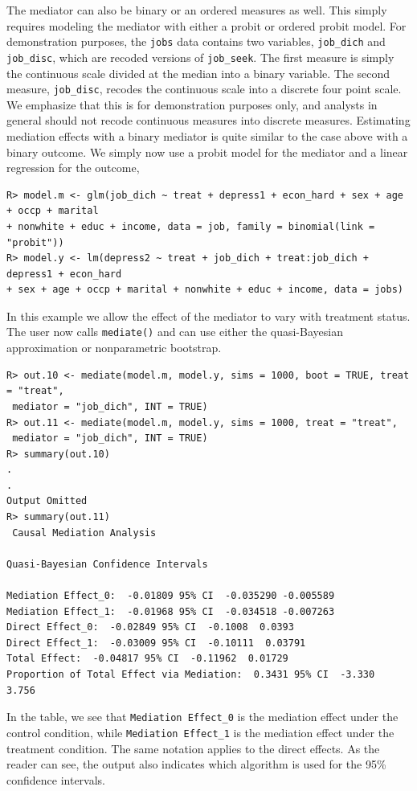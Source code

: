 \documentclass[11pt,letterpaper]{article}
\theoremstyle{plain}
\begin{document}
The mediator can also be binary or an ordered measures as well.  This
simply requires modeling the mediator with either a probit or ordered
probit model.  For demonstration purposes, the \texttt{jobs} data
contains two variables, \texttt{job\_dich} and \texttt{job\_disc},
which are recoded versions of \texttt{job\_seek}.  The first measure
is simply the continuous scale divided at the median into a binary
variable.  The second measure, \texttt{job\_disc}, recodes the
continuous scale into a discrete four point scale.  We emphasize that
this is for demonstration purposes only, and analysts in general
should not recode continuous measures into discrete measures.
Estimating mediation effects with a binary mediator is quite similar
to the case above with a binary outcome.  We simply now use a probit
model for the mediator and a linear regression for the outcome,
\begin{verbatim}
R> model.m <- glm(job_dich ~ treat + depress1 + econ_hard + sex + age + occp + marital
+ nonwhite + educ + income, data = job, family = binomial(link = "probit"))
R> model.y <- lm(depress2 ~ treat + job_dich + treat:job_dich + depress1 + econ_hard
+ sex + age + occp + marital + nonwhite + educ + income, data = jobs)
\end{verbatim}

In this example we allow the effect of the mediator to vary with
treatment status.  The user now calls \texttt{mediate()} and can use
either the quasi-Bayesian approximation or nonparametric bootstrap.
\begin{verbatim}
R> out.10 <- mediate(model.m, model.y, sims = 1000, boot = TRUE, treat = "treat", 
 mediator = "job_dich", INT = TRUE)
R> out.11 <- mediate(model.m, model.y, sims = 1000, treat = "treat", 
 mediator = "job_dich", INT = TRUE)
R> summary(out.10)
.
.
Output Omitted
R> summary(out.11)
 Causal Mediation Analysis 

Quasi-Bayesian Confidence Intervals

Mediation Effect_0:  -0.01809 95% CI  -0.035290 -0.005589 
Mediation Effect_1:  -0.01968 95% CI  -0.034518 -0.007263 
Direct Effect_0:  -0.02849 95% CI  -0.1008  0.0393 
Direct Effect_1:  -0.03009 95% CI  -0.10111  0.03791 
Total Effect:  -0.04817 95% CI  -0.11962  0.01729 
Proportion of Total Effect via Mediation:  0.3431 95% CI  -3.330  3.756 
\end{verbatim}

\noindent In the table, we see that \texttt{Mediation Effect\_0} is
the mediation effect under the control condition, while
\texttt{Mediation Effect\_1} is the mediation effect under the
treatment condition.  The same notation applies to the direct effects.
As the reader can see, the output also indicates which algorithm is
used for the 95\% confidence intervals.
\end{document}
